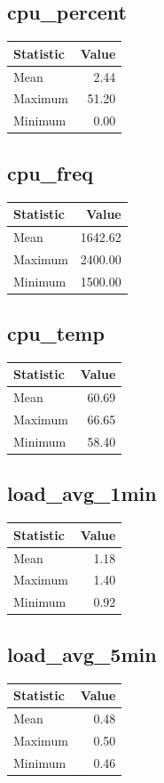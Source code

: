 \documentclass[11pt]{article}
\begin{document}
\subsection{cpu_percent}
\begin{tabular}{lr}
\toprule
Statistic & Value \\
\midrule
Mean & 2.44 \\
Maximum & 51.20 \\
Minimum & 0.00 \\
\bottomrule
\end{tabular}


\subsection{cpu_freq}
\begin{tabular}{lr}
\toprule
Statistic & Value \\
\midrule
Mean & 1642.62 \\
Maximum & 2400.00 \\
Minimum & 1500.00 \\
\bottomrule
\end{tabular}


\subsection{cpu_temp}
\begin{tabular}{lr}
\toprule
Statistic & Value \\
\midrule
Mean & 60.69 \\
Maximum & 66.65 \\
Minimum & 58.40 \\
\bottomrule
\end{tabular}


\subsection{load_avg_1min}
\begin{tabular}{lr}
\toprule
Statistic & Value \\
\midrule
Mean & 1.18 \\
Maximum & 1.40 \\
Minimum & 0.92 \\
\bottomrule
\end{tabular}


\subsection{load_avg_5min}
\begin{tabular}{lr}
\toprule
Statistic & Value \\
\midrule
Mean & 0.48 \\
Maximum & 0.50 \\
Minimum & 0.46 \\
\bottomrule
\end{tabular}
\end{document}

